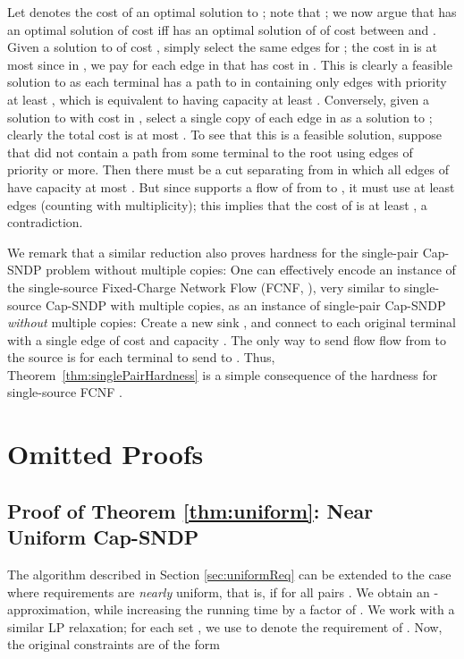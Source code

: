 \documentclass[11pt]{article}
\newcounter{thm0Rcopies}
\newcounter{thm_saved}
\begin{document}
Let  denotes the cost of an optimal solution to ;
note that ; we now argue that  has an
optimal solution of cost  iff  has an optimal
solution of of cost between  and . Given
a solution  to  of cost , simply select the
same edges for ; the cost in  is
at most  since in , we pay  for each
edge in  that has cost  in .  This is
clearly a feasible solution to  as each terminal 
has a path to  in  containing only edges with priority at
least , which is equivalent to having capacity at least
. Conversely, given a solution  to  with
cost in , select a single copy of each edge in 
as a solution to ; clearly the total cost is at most
. To see that this is a feasible solution, suppose that  did
not contain a path from some terminal  to the root  using edges
of priority  or more. Then there must be a cut separating 
from  in which all edges of  have capacity at most . But since  supports a flow of  from  to ,
it must use at least  edges (counting with multiplicity); this
implies that the cost of  is at least , a
contradiction.

\bigskip
We remark that a similar reduction also proves 
hardness for the single-pair Cap-SNDP problem without multiple copies:
One can effectively encode an instance of the single-source
Fixed-Charge Network Flow (FCNF, \cite{CGNS}), very similar to
single-source Cap-SNDP with multiple copies, as an instance of
single-pair Cap-SNDP \emph{without} multiple copies: Create a new sink
, and connect  to each original terminal  with a single
edge of cost  and capacity . The only way to send flow
 flow from  to the source  is for each
terminal  to send  to . Thus,
Theorem~\ref{thm:singlePairHardness} is a simple consequence of the
 hardness for single-source FCNF \cite{CGNS}.




\section{Omitted Proofs}
\label{app:omittedProofs}

\subsection{Proof of Theorem \ref{thm:uniform}: Near Uniform Cap-SNDP}
\label{app:nearlyUniform}

The algorithm described in Section \ref{sec:uniformReq} can be
extended to the case where requirements are \emph{nearly} uniform,
that is, if  for all pairs . We obtain an -approximation, while
increasing the running time by a factor of . We work
with a similar LP relaxation; for each set , we use
 to denote the
requirement of . Now, the original constraints are of the form
\end{document}
